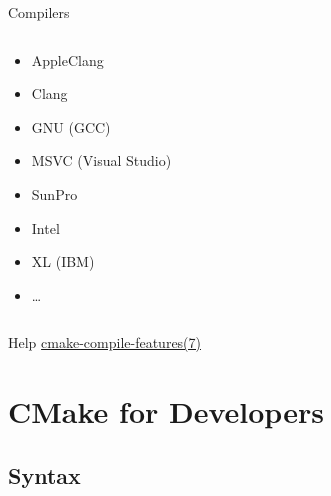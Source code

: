 \documentclass[t]{beamer}
\begin{document}
\begin{frame}{Compilers}
    \begin{columns}[T]
        \begin{column}{0.5\textwidth}
            \begin{itemize}
                \item AppleClang
                \item Clang
                \item GNU (GCC)
                \item MSVC (Visual Studio)
                \item SunPro
                \item Intel
                \item XL (IBM)
                \item …
            \end{itemize}
        \end{column}
        \begin{column}{0.5\textwidth}
        \end{column}
    \end{columns}

    \begin{block}{Help}
        \href{https://cmake.org/cmake/help/latest/manual/cmake-compile-features.7.html}{cmake-compile-features(7)}
    \end{block}
\end{frame}

\section{CMake for Developers}


\subsection{Syntax}
\end{document}
